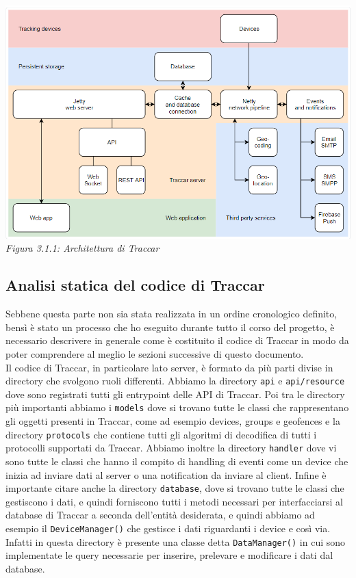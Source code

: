 \documentclass[a4paper,titlepage,12pt]{report}
\begin{document}
{\begin{center}
\includegraphics[scale=0.5]{images/arcTraccar.png} \\
\textit{Figura 3.1.1: Architettura di Traccar}
\end{center}

\subsection{
Analisi statica del codice di Traccar}
Sebbene questa parte non sia stata realizzata in un ordine cronologico definito, bensì è stato un processo che ho eseguito durante tutto il corso del progetto, è necessario descrivere in generale come è costituito il codice di Traccar in modo da poter comprendere al meglio le sezioni successive di questo documento.\\
Il codice di Traccar, in particolare lato server, è formato da più parti divise in directory che svolgono ruoli differenti. Abbiamo la directory \texttt{api} e \texttt{api/resource} dove sono registrati tutti gli entrypoint delle API di Traccar. Poi tra le directory più importanti abbiamo i \texttt{models} dove si trovano tutte le classi che rappresentano gli oggetti presenti in Traccar, come ad esempio devices, groups e geofences e la directory \texttt{protocols} che contiene tutti gli algoritmi di decodifica di tutti i protocolli supportati da Traccar. Abbiamo inoltre la directory \texttt{handler} dove vi sono tutte le classi che hanno il compito di handling di eventi come un device che inizia ad inviare dati al server o una notification da inviare al client. Infine è importante citare anche la directory \texttt{database}, dove si trovano tutte le classi che gestiscono i dati, e quindi forniscono tutti i metodi necessari per interfacciarsi al database di Traccar a seconda dell'entità desiderata, e quindi abbiamo ad esempio il \texttt{DeviceManager()} che gestisce i dati riguardanti i device e così via. Infatti in questa directory è presente una classe detta \texttt{DataManager()} in cui sono implementate le query necessarie per inserire, prelevare e modificare i dati dal database.

}
\end{document}
